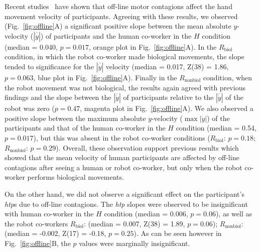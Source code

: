 Recent studies~\cite{Noy:B&C:2009, Kilner:SocialNeuro:2007} have shown that off-line motor contagions affect the hand movement velocity of participants. Agreeing with these results, we observed (Fig.~\ref{fig:offline}A) a significant positive slope between the mean absolute $y$-velocity ($|\overline{\dot{y}}|$) of participants and the human co-worker in the $H$ condition (median = 0.040, $p = 0.017$, orange plot in Fig.~\ref{fig:offline}A). In the $R_{\text{biol}}$ condition, in which the robot co-worker made biological movements, the slope tended to significance for the $|\overline{\dot{y}}|$ velocity (median = 0.017, Z(38) = 1.86, $p = 0.063$, blue plot in Fig.~\ref{fig:offline}A). Finally in the $R_{\text{nonbiol}}$ condition, when the robot movement was not biological, the results again agreed with previous findings and the slope between the $|\overline{\dot{y}}|$ of participants relative to the $|\overline{\dot{y}}|$ of the robot was zero ($p = 0.47$, magenta plot in Fig.~\ref{fig:offline}A). We also observed a positive slope between the maximum absolute $y$-velocity ($\max |\dot{y}|$) of the participants and that of the human co-worker in the $H$ condition (median = 0.54, $p = 0.017$), but this was absent in the robot co-worker conditions ($R_{\text{biol}}$: $p = 0.18$; $R_{\text{nonbiol}}$: $p = 0.29$). Overall, these observation support previous results which showed that the mean velocity of human participants are affected by off-line contagions after seeing a human or robot co-worker, but only when the robot co-worker performs biological movements.

On the other hand, we did not observe a significant effect on the participant's {\it htp}s due to off-line contagions. The {\it htp} slopes were observed to be insignificant with human co-worker in the $H$ condition (median = 0.006, $p = 0.06$), as well as the robot co-workers $R_{\text{biol}}$: (median = 0.007, Z(38) = 1.89, $p = 0.06$); $R_{\text{nonbiol}}$: (median = -0.002, Z(17) = -0.18, $p = 0.25$). As can be seen however in Fig.~\ref{fig:offline}B, the $p$ values were marginally insignificant.


